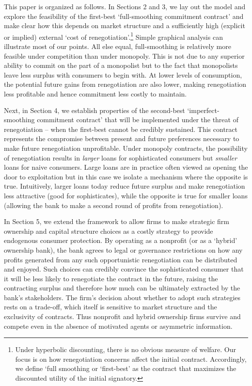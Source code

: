 \documentclass[11pt,english]{article}
\theoremstyle{plain}
\theoremstyle{definition}
\begin{document}
This paper is organized as follows. In Sections 2 and 3, we lay out the model and explore
the feasibility of the first-best `full-smoothing commitment contract'
and make clear how this depends on market structure and a sufficiently high (explicit or implied) external
`cost of renegotiation'.\footnote{Under hyperbolic discounting, there is no obvious measure of welfare.
Our focus is on how renegotiation concerns affect the initial contract.
Accordingly, we define `full smoothing or `first-best' as the contract
that maximizes the discounted utility of the initial signatory.} Simple graphical analysis can  illustrate most of our points.
All else equal, full-smoothing is relatively more feasible
under competition than under monopoly. This is not due to any superior
ability to commit on the part of a monopolist but to the fact that monopolists leave less surplus with consumers to begin with. At lower levels of consumption, the potential
future gains from renegotiation are also lower, making renegotiation
less profitable and hence commitment less costly to maintain.

Next, in Section 4, we establish properties of the second-best `imperfect-smoothing
commitment contract' that will be implemented under the threat of renegotiation -- when the first-best
cannot be credibly sustained. This contract represents the compromise
between present and future preferences necessary to make future renegotiation
unprofitable. Under monopoly contracts, the possibility of renegotiation results
in \emph{larger} loans for sophisticated consumers but \emph{smaller}
loans for naive consumers. Large loans are in practice often viewed
as opening the door to exploitation but in this case we isolate a
mechanism where the opposite is true. Intuitively, larger loans today
reduce future surplus and make renegotiation less attractive (good
for sophisticates), while the opposite is true for smaller loans (allowing
the bank to make a second round of profits from renegotiation). 

In Section 5, we extend the framework to allow firms to make strategic firm ownership and capital structure choices as a costly strategy to provide
endogenous consumer protection. By operating as a nonprofit
(or as a `hybrid' ownership bank), the bank agrees to legal or governance
restrictions on how any profits generated from any such opportunistic
renegotiation can be distributed and enjoyed. Such choices can credibly
convince the sophisticated consumer that it will be less likely to
renegotiate the contract in the future, raising the contracting surplus
and therefore how much can be ultimately extracted by the bank's stakeholders.
The firm's decision about whether to adopt such strategies
rests on a trade-off, which itself is sensitive to market structure
and the exclusivity of contracts. Thus nonprofit and hybrid ownership firms survive
and compete even in the absence of motivated agents or asymmetric information.
\end{document}
